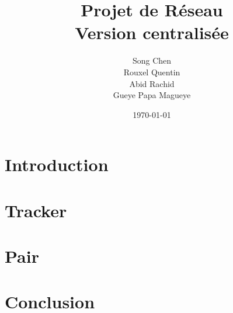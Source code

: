 \documentclass[a4]{report}
\begin{document}
\title{\huge{\textbf{Projet de Réseau}}\\ \Large{\textbf{Version centralisée}}\\}
\author{Song Chen\\ Rouxel Quentin \\ Abid Rachid \\ Gueye Papa Magueye}
\date{\today}

\maketitle{}

\newpage

\chapter*{Introduction}


\chapter{Tracker}


\chapter{Pair}


\chapter*{Conclusion}

\end{document}
